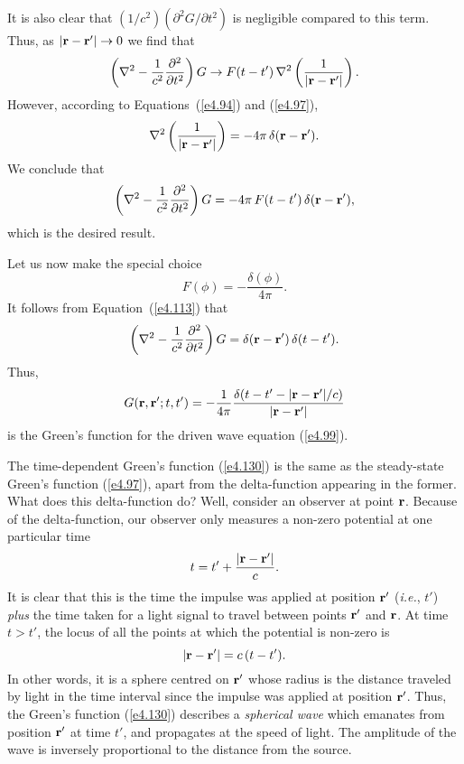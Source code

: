It is also clear that $(1/c^2)(\partial^2 G/\partial t^2)$ is negligible compared to this term.
 Thus, as $|{\bf r} - {\bf r}'| \rightarrow 0$ we find
that
\begin{equation}
\left(\nabla^2- \frac{1}{c^2}\frac{\partial^2}{\partial t^2}\right)
 G \rightarrow F(t-t')\, \nabla^2\left(\frac{1}{|{\bf r} - {\bf r}'|}\right).
\end{equation}
However, according to Equations~(\ref{e4.94}) and (\ref{e4.97}),
\begin{equation}
\nabla^2 \left(\frac{1}{|{\bf r} - {\bf r}'|} \right)= - 4\pi\,\delta({\bf r} - {\bf r}').
\end{equation}
We conclude that
\begin{equation}\label{e4.113}
\left(\nabla^2 - \frac{1}{c^2} \frac{\partial^2}{\partial t^2} \right)
G = - 4\pi \,F(t-t')\,\delta({\bf r}- {\bf r}'),
\end{equation}
which is the desired result.

Let us now make the special choice
\begin{equation}
F(\phi) = -\frac{\delta(\phi)}{4\pi}.
\end{equation}
It follows from Equation~(\ref{e4.113}) that
\begin{equation}
\left(\nabla^2 - \frac{1}{c^2} \frac{\partial^2}{\partial t^2} \right)G=
\delta({\bf r} - {\bf r}') \,\delta(t-t').
\end{equation}
Thus,
\begin{equation}\label{e4.130}
G({\bf r}, {\bf r}'; t, t') = -\frac{1}{4\pi} \frac{\delta(t-t'-|{\bf r} - {\bf r}'|/c)}
{|{\bf r} - {\bf r}'|}
\end{equation}
is the Green's function for the driven wave equation (\ref{e4.99}).

The time-dependent Green's function (\ref{e4.130}) is the same as the steady-state Green's function
(\ref{e4.97}), apart from the delta-function appearing in the former. What does this delta-function do?
Well, consider an observer at point ${\bf r}$. Because of the delta-function, our observer 
only measures a non-zero potential at one particular time
\begin{equation}
t = t' +\frac{ |{\bf r} - {\bf r'}|}{c}.
\end{equation}
It is clear that this is the time the impulse was applied at position ${\bf r'}$ ({\em i.e.}, $t'$)
{\em plus} the time taken for a light signal to travel between points ${\bf r'}$ and
${\bf r}$. At time $t>t'$, the locus of all the points at which the potential is non-zero
is
\begin{equation}
|{\bf r} - {\bf r'}| = c\,(t-t').
\end{equation}
In other words, it is a sphere centred on ${\bf r}'$ whose radius is the distance traveled by
light in the time interval since the impulse was applied at position ${\bf r'}$.
Thus, the Green's function (\ref{e4.130}) describes a {\em spherical wave}\/ which emanates from position
${\bf r'}$ at time $t'$, and propagates at the speed of light. The amplitude of the wave
is inversely proportional to the distance from the source. 

